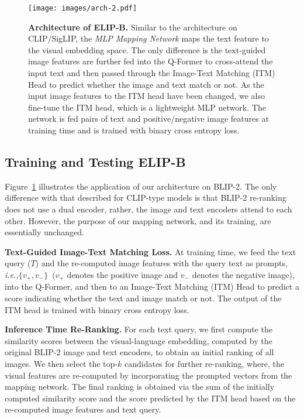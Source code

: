 \begin{figure}[t]
\centering
\texttt{[image: images/arch-2.pdf]}
\vspace{-2mm}
\caption{\textbf{Architecture of ELIP-B.} Similar to the architecture on CLIP/SigLIP, the \emph{MLP Mapping Network} maps the text feature to the visual embedding space. The only difference is the text-guided image features are further fed into the Q-Former to cross-attend the input text and then passed through the Image-Text Matching (ITM) Head to predict whether the image and text match or not. As the input image features to the ITM head have been changed, we also fine-tune the ITM head, which is a lightweight MLP network. The network is fed pairs of text and positive/negative image features at training time and is trained with binary cross entropy loss.}
\vspace{-3mm}
\label{fig:arch-2}
\end{figure}

\subsection{Training and Testing ELIP-B}
\label{sec:arch-blip}

Figure~\ref{fig:arch-2} illustrates the application of our architecture on BLIP-2. The only difference with that described for CLIP-type models is that BLIP-2 re-ranking does not use a dual encoder, rather, the image and text encoders attend to each other. However, the purpose of our mapping network, and its training, are essentially unchanged.


\vspace{2pt}
\noindent \textbf{Text-Guided Image-Text Matching Loss.}
At training time, we feed the text query ($T$) and the re-computed image features with the query text as prompts, \emph{i.e.,$\{v_+, v_-\}$}~($v_+$ denotes the positive image and $v_-$ denotes the negative image), into the Q-Former, and then to an Image-Text Matching (ITM) Head to predict a score indicating whether the text and image match or not. The output of the ITM head is trained with binary cross entropy loss. 


\vspace{2pt}
\noindent \textbf{Inference Time Re-Ranking.}
For each text query, we first compute the similarity scores between the visual-language embedding, computed by the original BLIP-2 image and text encoders, to obtain an initial ranking of all images. We then select the top-$k$ candidates for further re-ranking, where, the visual features are re-computed by incorporating the prompted vectors from the mapping network. The final ranking is obtained via the sum of the initially computed similarity score and the score predicted by the ITM head based on the re-computed image features and text query.









